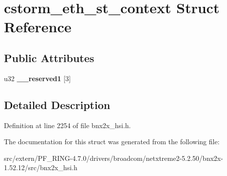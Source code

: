 \hypertarget{structcstorm__eth__st__context}{
\section{cstorm\_\-eth\_\-st\_\-context Struct Reference}
\label{structcstorm__eth__st__context}
}
\subsection*{Public Attributes}
\begin{DoxyCompactItemize}
\item 
\hypertarget{structcstorm__eth__st__context_a946f7229c5c7c7df3603f3c9a4384d39}{
u32 {\bfseries \_\-\_\-reserved1} \mbox{[}3\mbox{]}}
\label{structcstorm__eth__st__context_a946f7229c5c7c7df3603f3c9a4384d39}

\end{DoxyCompactItemize}


\subsection{Detailed Description}


Definition at line 2254 of file bnx2x\_\-hsi.h.



The documentation for this struct was generated from the following file:\begin{DoxyCompactItemize}
\item 
src/extern/PF\_\-RING-\/4.7.0/drivers/broadcom/netxtreme2-\/5.2.50/bnx2x-\/1.52.12/src/bnx2x\_\-hsi.h\end{DoxyCompactItemize}
